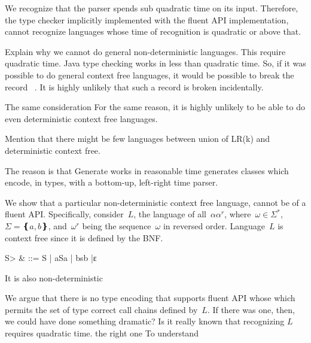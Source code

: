 We recognize that the \Java parser spends sub quadratic time
  on its input.
Therefore,
  the type checker implicitly implemented with the fluent API implementation,
  cannot recognize languages whose time of recognition is quadratic or above that.

Explain why we cannot do general non-deterministic languages. This require quadratic time.
Java type checking works in less than quadratic time. So, if it was possible to
do general context free languages, it would be possible to break the record
~\cite{cubic time algorithms}.
It is highly unlikely that such a record is broken incidentally.

The same consideration
For the same reason, it is highly unlikely to be able to do even deterministic context free languages.
~\cite{http://www.sciencedirect.com/science/article/pii/S0019995868910875}

   Mention that there might be few languages between union of LR(k) and deterministic context free.

The reason is that Generate works in reasonable time \Self generates classes which encode, in types, with a bottom-up, left-right time parser.

We show that a particular non-deterministic context free language,
cannot be of a fluent API.
Specifically, consider~$L$, the language of all~$αα^r$, where~$\omega∈Σ^*$,~$Σ=❴a,b❵$,
and~$\omega^r$ being the sequence~$\omega$ in reversed order.
Language~$L$ is context free since it is defined by the BNF.
\begin{Grammar}
  \begin{aligned}
    \<S> & ::= S | aSa | bsb |ε
  \end{aligned}
\end{Grammar}
It is also non-deterministic~\cite{Tomer:again:start:tracing:from:wikipedia:until:you:find:the excact}

We argue that there is no type encoding that supports fluent API whose
  which permits the set of type correct call chains defined by~$L$.
If there was one, then, we could have done something dramatic?
Is it really known that recognizing $L$  requires quadratic
  time.
 the right one 
To understand
